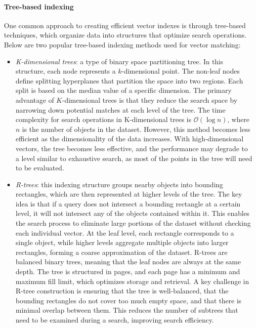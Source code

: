 \paragraph*{Tree-based indexing}
One common approach to creating efficient vector indexes is through tree-based techniques, which organize data into structures that optimize search operations. 
Below are two popular tree-based indexing methods used for vector matching:
\begin{itemize}
    \item \textit{K-dimensional trees}: a type of binary space partitioning tree. 
        In this structure, each node represents a $k$-dimensional point. 
        The non-leaf nodes define splitting hyperplanes that partition the space into two regions. 
        Each split is based on the median value of a specific dimension. 
        The primary advantage of $K$-dimensional trees is that they reduce the search space by narrowing down potential matches at each level of the tree.
        The time complexity for search operations in K-dimensional trees is $\mathcal{O}(\log n)$, where $n$ is the number of objects in the dataset. 
        However, this method becomes less efficient as the dimensionality of the data increases. 
        With high-dimensional vectors, the tree becomes less effective, and the performance may degrade to a level similar to exhaustive search, as most of the points in the tree will need to be evaluated. 
    \item \textit{R-trees}: this indexing structure groups nearby objects into bounding rectangles, which are then represented at higher levels of the tree. 
        The key idea is that if a query does not intersect a bounding rectangle at a certain level, it will not intersect any of the objects contained within it. 
        This enables the search process to eliminate large portions of the dataset without checking each individual vector. 
        At the leaf level, each rectangle corresponds to a single object, while higher levels aggregate multiple objects into larger rectangles, forming a coarse approximation of the dataset.
        R-trees are balanced binary trees, meaning that the leaf nodes are always at the same depth. 
        The tree is structured in pages, and each page has a minimum and maximum fill limit, which optimizes storage and retrieval.
        A key challenge in R-tree construction is ensuring that the tree is well-balanced, that the bounding rectangles do not cover too much empty space, and that there is minimal overlap between them. 
        This reduces the number of subtrees that need to be examined during a search, improving search efficiency.
\end{itemize}


